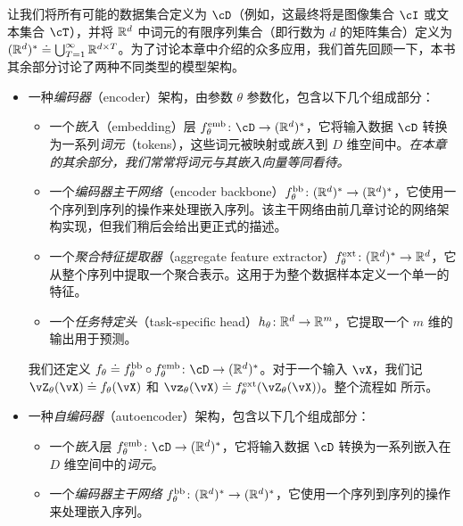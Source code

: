 \documentclass[../../book-main.tex]{subfiles}
\begin{document}
让我们将所有可能的数据集合定义为 \(\cD\)（例如，这最终将是图像集合 \(\cI\) 或文本集合 \(\cT\)），并将 \(\mathbb{R}^{d}\) 中词元的有限序列集合（即行数为 \(d\) 的矩阵集合）定义为 \((\mathbb{R}^{d})^{*} \doteq \bigcup_{T = 1}^{\infty}\mathbb{R}^{d \times T}\)。为了讨论本章中介绍的众多应用，我们首先回顾一下，本书其余部分讨论了两种不同类型的模型架构。
\begin{itemize}
    \item 一种\textit{编码器}（encoder）架构，由参数 \(\theta\) 参数化，包含以下几个组成部分：
    \begin{itemize}
        \item 一个\textit{嵌入}（embedding）层 \(f_{\theta}^{\emb} \colon \cD \to (\R^{d})^{*}\)，它将输入数据 \(\cD\) 转换为一系列\textit{词元}（tokens），这些词元被映射或\textit{嵌入}到 \(D\) 维空间中。\textit{在本章的其余部分，我们常常将词元与其嵌入向量等同看待。}
        \item 一个\textit{编码器主干网络}（encoder backbone）\(f_{\theta}^{\mathrm{bb}} \colon (\mathbb{R}^{d})^{*} \to (\mathbb{R}^{d})^{*}\)，它使用一个序列到序列的操作来处理嵌入序列。该主干网络由前几章讨论的网络架构实现，但我们稍后会给出更正式的描述。
        \item 一个\textit{聚合特征提取器}（aggregate feature extractor）\(f_{\theta}^{\mathrm{ext}} \colon (\mathbb{R}^{d})^{*} \to \mathbb{R}^{d}\)，它从整个序列中提取一个聚合表示。这用于为整个数据样本定义一个单一的特征。
        \item 一个\textit{任务特定头}（task-specific head）\(h_{\theta} \colon \mathbb{R}^{d} \to \mathbb{R}^{m}\)，它提取一个 \(m\) 维的输出用于预测。
    \end{itemize}
    我们还定义 \(f_{\theta} \doteq f_{\theta}^{\backbone} \circ f_{\theta}^{\emb} \colon \cD \to (\R^{d})^{*}\)。对于一个输入 \(\vX\)，我们记 \(\vZ_{\theta}(\vX) \doteq f_{\theta}(\vX)\) 和 \(\vz_{\theta}(\vX) \doteq f_{\theta}^{\ext}(\vZ_{\theta}(\vX))\)。整个流程如  所示。
    \item 一种\textit{自编码器}（autoencoder）架构，包含以下几个组成部分：
    \begin{itemize}
        \item 一个\textit{嵌入}层 \(f_{\theta}^{\emb} \colon \cD \to (\R^{d})^{*}\)，它将输入数据 \(\cD\) 转换为一系列嵌入在 \(D\) 维空间中的\textit{词元}。
        \item 一个\textit{编码器主干网络} \(f_{\theta}^{\mathrm{bb}} \colon (\mathbb{R}^{d})^{*} \to (\mathbb{R}^{d})^{*}\)，它使用一个序列到序列的操作来处理嵌入序列。

\end{itemize}
\end{itemize}
\end{document}
